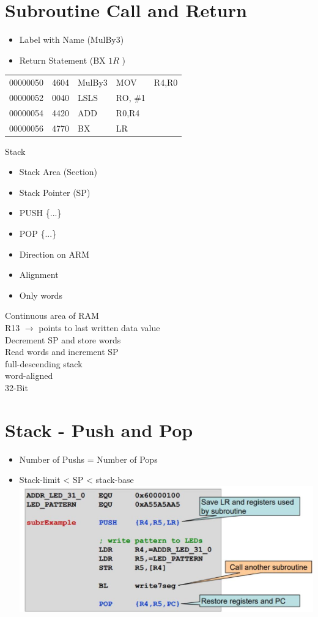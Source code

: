 \documentclass[10pt]{article}
\begin{document}
\section*{Subroutine Call and Return}
\begin{itemize}
  \item Label with Name (MulBy3)
  \item Return Statement (BX $1 R$ )
\end{itemize}

\begin{center}
\begin{tabular}{lllll}
00000050 & 4604 & MulBy3 & MOV & R4,R0 \\
00000052 & 0040 & LSLS & RO, \#1 &  \\
00000054 & 4420 & ADD & R0,R4 &  \\
00000056 & 4770 & BX & LR &  \\
\hline
\end{tabular}
\end{center}

Stack

\begin{itemize}
  \item Stack Area (Section)
  \item Stack Pointer (SP)
  \item PUSH \{...\}
  \item POP \{...\}
  \item Direction on ARM
  \item Alignment
  \item Only words
\end{itemize}

Continuous area of RAM\\
R13 $\rightarrow$ points to last written data value\\
Decrement SP and store words\\
Read words and increment SP\\
full-descending stack\\
word-aligned\\
32-Bit

\section*{Stack - Push and Pop}
\begin{itemize}
  \item Number of Pushs = Number of Pops
  \item Stack-limit < SP < stack-base\\
\includegraphics[max width=\textwidth, center]{2024_12_29_79e6b22f503fb7b4f718g-08}
\end{itemize}
\end{document}
